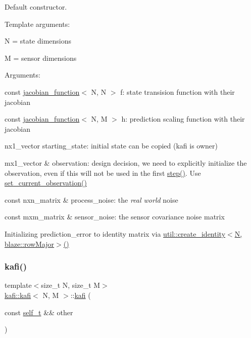 Default constructor. 

Template arguments\+:
\begin{DoxyItemize}
\item {\ttfamily N} = state dimensions
\item {\ttfamily M} = sensor dimensions
\end{DoxyItemize}

Arguments\+:
\begin{DoxyItemize}
\item {\ttfamily const \hyperlink{classkafi_1_1jacobian__function}{jacobian\+\_\+function}$<$ N, N $>$ f}\+: state transision function with their jacobian
\item {\ttfamily const \hyperlink{classkafi_1_1jacobian__function}{jacobian\+\_\+function}$<$ N, M $>$ h}\+: prediction scaling function with their jacobian
\item {\ttfamily nx1\+\_\+vector starting\+\_\+state}\+: initial state can be copied (kafi is owner)
\item {\ttfamily mx1\+\_\+vector \& observation}\+: design decision, we need to explicitly initialize the observation, even if this will not be used in the first \hyperlink{classkafi_1_1kafi_ae78f8f011e499e806294d6e6575a47c3}{step()}. Use {\ttfamily \hyperlink{classkafi_1_1kafi_a8bb1520922ac9bab7479c89a9681b956}{set\+\_\+current\+\_\+observation()}}
\item {\ttfamily const nxn\+\_\+matrix \& process\+\_\+noise}\+: the {\itshape real world} noise
\item {\ttfamily const mxm\+\_\+matrix \& sensor\+\_\+noise}\+: the sensor covariance noise matrix

Initializing {\ttfamily prediction\+\_\+error} to identity matrix via \hyperlink{namespacekafi_1_1util_adebb31ac70499385be7e7693e9c73453}{util\+::create\+\_\+identity$<$\+N, blaze\+::row\+Major$>$()} 
\end{DoxyItemize}\mbox{\label{classkafi_1_1kafi_ac2331ba8c5ad075cbdb6580eb41bf9eb}} 
\subsubsection{\texorpdfstring{kafi()}{kafi()}\hspace{0.1cm}{\footnotesize\ttfamily [2/2]}}
{\footnotesize\ttfamily template$<$size\+\_\+t N, size\+\_\+t M$>$ \\
\hyperlink{classkafi_1_1kafi}{kafi\+::kafi}$<$ N, M $>$\+::\hyperlink{classkafi_1_1kafi}{kafi} (\begin{DoxyParamCaption}\item[{const \hyperlink{classkafi_1_1kafi_a9fc1cf6d76a14493ec33c03f3a3699c7}{self\+\_\+t} \&\&}]{other }\end{DoxyParamCaption})\hspace{0.3cm}{\ttfamily [delete]}}




